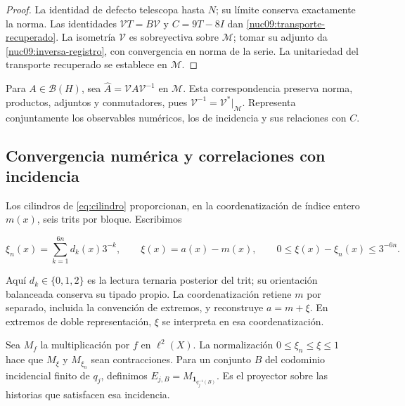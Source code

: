 \begin{proof}
La identidad de defecto telescopa hasta \(N\); su límite conserva
exactamente la norma. Las identidades
\(\mathcal VT=B\mathcal V\) y \(C=9T-8I\) dan
\eqref{nuc09:transporte-recuperado}.
La isometría \(\mathcal V\) es sobreyectiva sobre \(\mathcal M\);
tomar su adjunto da \eqref{nuc09:inversa-registro}, con convergencia
en norma de la serie. La unitariedad del transporte recuperado
se establece en \(\mathcal M\).
\end{proof}

Para \(A\in\mathcal B(H)\), sea
\(\widehat A=\mathcal VA\mathcal V^{-1}\) en \(\mathcal M\).
Esta correspondencia preserva norma, productos, adjuntos y conmutadores,
pues \(\mathcal V^{-1}=\mathcal V^*|_{\mathcal M}\).
Representa conjuntamente los observables numéricos, los de incidencia
y sus relaciones con \(C\).

\subsection{Convergencia numérica y correlaciones con incidencia}

Los cilindros de \eqref{eq:cilindro} proporcionan, en la coordenatización de
índice entero \(m(x)\), seis trits por bloque. Escribimos



\[
\xi_n(x)=\sum_{k=1}^{6n}d_k(x)3^{-k},\qquad
\xi(x)=a(x)-m(x),\qquad 0\le\xi(x)-\xi_n(x)\le3^{-6n}.
\]



Aquí \(d_k\in\{0,1,2\}\) es la lectura ternaria posterior del trit;
su orientación balanceada conserva su tipado propio. La coordenatización
retiene \(m\) por separado, incluida la convención de extremos,
y reconstruye \(a=m+\xi\). En extremos de doble representación,
\(\xi\) se interpreta en esa coordenatización.

Sea \(M_f\) la multiplicación por \(f\) en \(\ell^2(X)\).
La normalización \(0\le\xi_n\le\xi\le1\) hace que
\(M_\xi\) y \(M_{\xi_n}\) sean contracciones.
Para un conjunto \(B\) del codominio incidencial finito de \(q_j\),
definimos
\(E_{j,B}=M_{\mathbf1_{q_j^{-1}(B)}}\).
Es el proyector sobre las historias que satisfacen esa incidencia.

